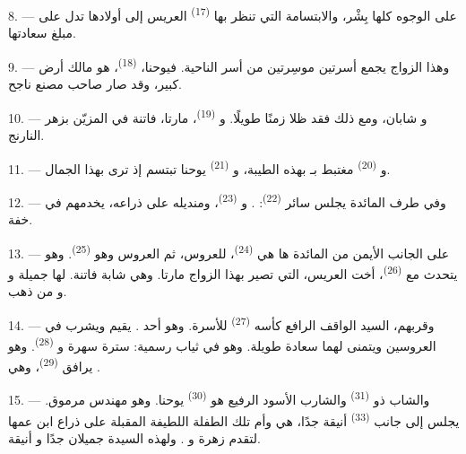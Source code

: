 \VUsaut{3.0mm}

8. --- على الوجوه كلها بِشْر، والابتسامة التي تنظر بها 
\textsuperscript{(17)} العريس إلى أولادها تدل على مبلغ سعادتها.

9. --- وهذا الزواج يجمع أسرتين موسِرتين من أسر الناحية. فيوحنا،
 \textsuperscript{(18)}، هو  مالك أرض كبير، وقد صار
 صاحب مصنع ناجح.

10. --- و شابان، ومع ذلك فقد ظلا  زمنًا
طويلًا. و \textsuperscript{(19)}، مارتا، فاتنة في
 المزيّن بزهر النارنج.

11. --- و \textsuperscript{(20)} مغتبط بـ بهذه
الطيبة، و \textsuperscript{(21)} يوحنا تبتسم إذ ترى 
بهذا الجمال.

12. --- وفي طرف المائدة يجلس سائر  \textsuperscript{(22)}:
. و \textsuperscript{(23)}،
ومنديله على ذراعه، يخدمهم في خفة.

\VUsaut{3.0mm}

13. --- على الجانب الأيمن من المائدة ها هي  \textsuperscript{(24)}،
 للعروس، ثم  العروس وهو 
\textsuperscript{(25)}. وهو يتحدث مع  \textsuperscript{(26)}، أخت
العريس، التي تصير بهذا الزواج  مارتا. وهي شابة فاتنة. لها
 جميلة و و من ذهب.

14. --- وقربهم، السيد الواقف الرافع كأسه  \textsuperscript{(27)}
للأسرة. وهو أحد . يقيم  ويشرب في
 العروسين ويتمنى لهما سعادة طويلة. وهو في ثياب رسمية: سترة
سهرة و \textsuperscript{(28)}. وهو يرافق 
\textsuperscript{(29)}، وهي .

15. --- والشاب ذو  \textsuperscript{(31)} والشارب الأسود
الرفيع هو  \textsuperscript{(30)} يوحنا. وهو مهندس مرموق. يجلس إلى
جانب  \textsuperscript{(33)} أنيقة جدًا، هي 
وأم تلك الطفلة اللطيفة المقبلة على ذراع ابن عمها لتقدم زهرة
و . ولهذه السيدة  جميلان
جدًا و أنيقة.

